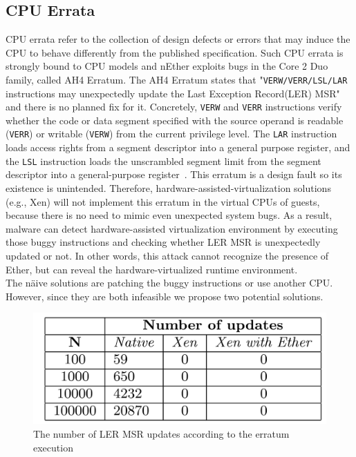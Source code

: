 \subsection{CPU Errata}
\label{sec:approach-errata}
CPU errata refer to the collection of design defects or errors that may induce the CPU to behave differently from the published specification. Such CPU errata is strongly bound to CPU models and nEther exploits bugs in the Core 2 Duo family, called AH4 Erratum. The AH4 Erratum states that "\texttt{VERW/VERR/LSL/LAR} instructions may unexpectedly update the Last Exception Record(LER) MSR" and there is no planned fix for it. Concretely, \texttt{VERW} and \texttt{VERR} instructions verify whether the code or data segment specified with the source operand is readable (\texttt{VERR}) or writable (\texttt{VERW}) from the current privilege level. The \texttt{LAR} instruction loads access rights from a segment descriptor into a general purpose register, and the \texttt{LSL} instruction loads the unscrambled segment limit from the segment descriptor into a general-purpose register~\cite{intelsys}. This erratum is a design fault so its existence is unintended. Therefore, hardware-assisted-virtualization solutions (e.g., Xen) will not implement this erratum in the virtual CPUs of guests, because there is no need to mimic even unexpected system bugs. As a result, malware can detect hardware-assisted virtualization environment by executing those buggy instructions and checking whether LER MSR is unexpectedly updated or not. In other words, this attack cannot recognize the presence of Ether, but can reveal the hardware-virtualized runtime environment. \\

The n{\"a}ive solutions are patching the buggy instructions or use another CPU. However, since they are both infeasible we propose two potential solutions.

\begin{figure}[!h]
	\centering
	\includegraphics[width=\linewidth]{figure/errata_table.png}
	\caption{The number of LER MSR updates according to the erratum execution}
	\label{fig:errata}
\end{figure}

